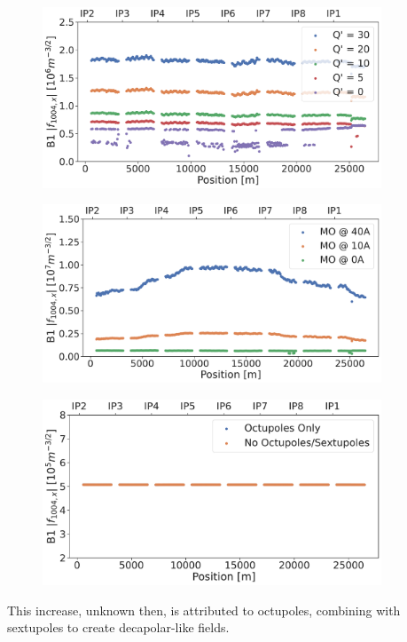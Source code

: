 \begin{figure}[H]
    \includegraphics[width=0.9\textwidth]{./images/f1004/f1004_dq.pdf}
    \caption{}
    \label{}
\end{figure}
\begin{figure}[H]
    \includegraphics[width=0.9\textwidth]{./images/f1004/f1004_mo.pdf}
    \caption{}
    \label{}
\end{figure}
\begin{figure}[H]
    \includegraphics[width=0.9\textwidth]{./images/f1004/f1004_no_ms.pdf}
    \caption{}
    \label{}
\end{figure}


This increase, unknown then, is attributed to octupoles, combining with sextupoles to create
decapolar-like fields.